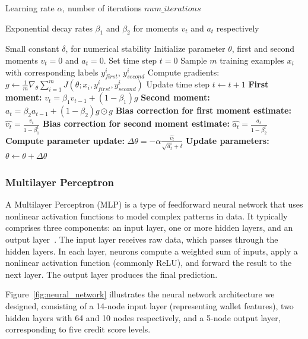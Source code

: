 \documentclass[runningheads]{llncs}
\begin{document}
{\begin{algorithm}[H]
\caption{Adam Algorithm Implementation.}\label{al2}
\begin{algorithmic}[1]
\Require Learning rate $\alpha$, number of iterations $num\_iterations$

Exponential decay rates $\beta_1$ and $\beta_2$ for moments $v_t$ and $a_t$ respectively

Small constant $\delta$, for numerical stability
\State Initialize parameter $\theta$, first and second moments $v_t = 0$ and $a_t = 0$.
\State Set time step $t = 0$
    \State Sample $m$ training examples $x_i$ with corresponding labels $y_{first}^i$, $y_{second}^i$
    \State Compute gradients: $g \leftarrow \frac{1}{m} \nabla_\theta \sum_{i=1}^m J(\theta; x_i, y_{first}^i, y_{second}^i)$
    \State Update time step $t \leftarrow t + 1$
    \State \textbf{First moment:} $v_t = \beta_1 v_{t-1} + (1 - \beta_1) g$
    \State \textbf{Second moment:} $a_t = \beta_2 a_{t-1} + (1 - \beta_2) g \odot g$
    \State \textbf{Bias correction for first moment estimate:} $\hat{v_t} = \frac{v_t}{1 - \beta_1^t}$
    \State \textbf{Bias correction for second moment estimate:} $\hat{a_t} = \frac{a_t}{1 - \beta_2^t}$
    \State \textbf{Compute parameter update:} $\Delta \theta = -\alpha \frac{\hat{v_t}}{\sqrt{\hat{a_t}} + \delta}$
    \State \textbf{Update parameters:} $\theta \leftarrow \theta + \Delta \theta$
\EndFor
\end{algorithmic}
\end{algorithm}


\subsubsection{Multilayer Perceptron}
A Multilayer Perceptron (MLP) is a type of feedforward neural network that uses nonlinear activation functions to model complex patterns in data. It typically comprises three components: an input layer, one or more hidden layers, and an output layer~\cite{8549859}. The input layer receives raw data, which passes through the hidden layers. In each layer, neurons compute a weighted sum of inputs, apply a nonlinear activation function (commonly ReLU), and forward the result to the next layer. The output layer produces the final prediction. 

Figure~\ref{fig:neural_network} illustrates the neural network architecture we designed, consisting of a 14-node input layer (representing wallet features), two hidden layers with 64 and 10 nodes respectively, and a 5-node output layer, corresponding to five credit score levels. %

}
\end{document}

